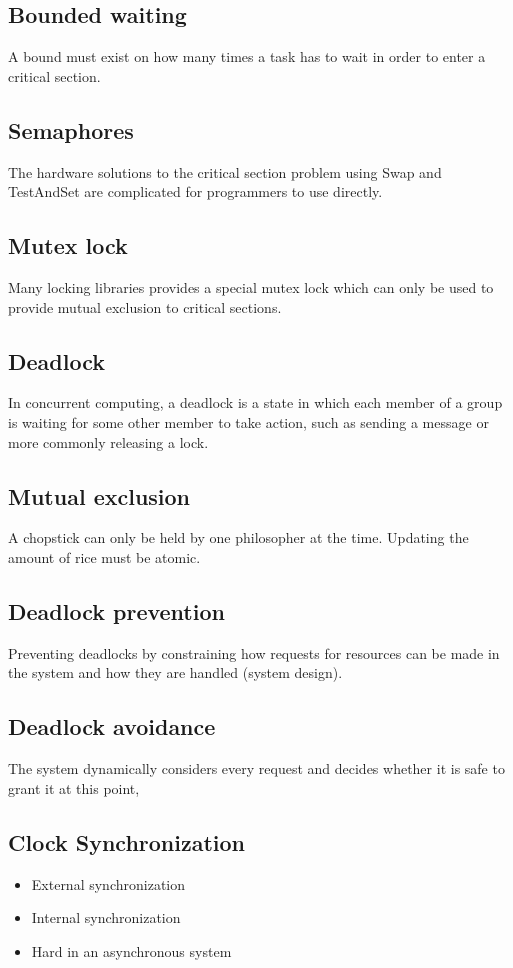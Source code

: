 \subsection{Bounded waiting}
A bound must exist on how many
times a task has to wait in order to
enter a critical section.

\subsection{Semaphores}
The hardware solutions to the critical section
problem using Swap and TestAndSet are
complicated for programmers to use directly.


\subsection{Mutex lock}
Many locking libraries provides a special
mutex lock which can only be used to
provide mutual exclusion to critical sections.

\subsection{Deadlock}
In concurrent computing, a deadlock is
a state in which each member of a
group is waiting for some other member
to take action, such as sending a
message or more commonly releasing a lock.

\subsection{Mutual exclusion}
A chopstick can only be held by one
philosopher at the time.
Updating the amount of rice must be atomic.

\subsection{Deadlock prevention}
Preventing deadlocks by constraining how requests for
resources can be made in the system and how they are
handled (system design).

\subsection{Deadlock avoidance}
The system dynamically considers every request and
decides whether it is safe to grant it at this point,

\subsection{Clock Synchronization}
\begin{itemize}
\item External synchronization
\item Internal synchronization
\item Hard in an asynchronous system
\end{itemize}

